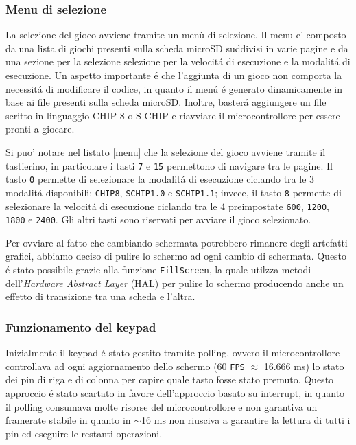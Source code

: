 \documentclass[a4paper]{article}
\begin{document}
\subsubsection{Menu di selezione}

La selezione del gioco avviene tramite un menù di selezione. Il menu e' composto da una lista di giochi presenti sulla scheda microSD suddivisi in varie pagine e da una sezione per la selezione selezione per la velocitá di esecuzione e la modalitá di esecuzione. Un aspetto importante \'e che l'aggiunta di un gioco non comporta la necessit\'a di modificare il codice, in quanto il men\'u \'e generato dinamicamente in base ai file presenti sulla scheda microSD. Inoltre, baster\'a aggiungere un file scritto in linguaggio CHIP-8 o S-CHIP e riavviare il microcontrollore per essere pronti a giocare.

Si puo' notare nel listato \ref{menu} che la selezione del gioco avviene tramite il tastierino, in particolare i tasti \texttt{7} e \texttt{15} permettono di navigare tra le pagine. Il tasto \texttt{0} permette di selezionare la modalitá di esecuzione ciclando tra le 3 modalitá disponibili: \texttt{CHIP8}, \texttt{SCHIP1.0} e \texttt{SCHIP1.1}; invece, il tasto \texttt{8} permette di selezionare la velocitá di esecuzione ciclando tra le 4 preimpostate \texttt{600}, \texttt{1200}, \texttt{1800} e \texttt{2400}. Gli altri tasti sono riservati per avviare il gioco selezionato.

\begin{Listing}[h!t] %
    \centering
    \caption{Menu di selezione.}
    \label{menu}
\end{Listing}

Per ovviare al fatto che cambiando schermata potrebbero rimanere degli artefatti grafici, abbiamo deciso di pulire lo schermo ad ogni cambio di schermata. Questo é stato possibile grazie alla funzione \texttt{FillScreen}, la quale utilzza metodi dell'\textit{Hardware Abstract Layer} (HAL) per pulire lo schermo producendo anche un effetto di transizione tra una scheda e l'altra.

\subsubsection{Funzionamento del keypad}\label{subsubsec:keypad}

Inizialmente il keypad é stato gestito tramite polling, ovvero il microcontrollore controllava ad ogni aggiornamento dello schermo (60 \texttt{FPS} $\approx$ 16.666 ms) lo stato dei pin di riga e di colonna per capire quale tasto fosse stato premuto. Questo approccio é stato scartato in favore dell'approccio basato su interrupt, in quanto il polling consumava molte risorse del microcontrollore e non garantiva un framerate stabile in quanto in $\sim$16 ms non riusciva a garantire la lettura di tutti i pin ed eseguire le restanti operazioni.
\end{document}
